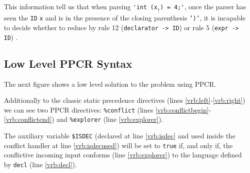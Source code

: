 This information tell us that when parsing 
\verb|'int (x|$_{\uparrow}$\verb|) = 4;'|,
once the parser has seen the \texttt{ID} \verb|x| and is in the presence
of the closing parenthesis \texttt{')'}, it is incapable to decide whether 
to reduce by rule 12 (\verb|declarator -> ID|) or rule 5 (\verb|expr -> ID|) .



\subsection{Low Level PPCR Syntax}
\label{subsection:llpcr}

The next figure shows a low level solution
to the problem using PPCR. 

Additionally to the classic static precedence directives (lines \ref{vrb:left}-\ref{vrb:right}) 
we can see two PPCR directives: \verb|%conflict| (lines \ref{vrb:conflictbegin}-\ref{vrb:conflictend})
and \verb|%explorer| (line \ref{vrb:explorer}). 

The auxiliary variable \verb|$ISDEC| 
(declared at line \ref{vrb:isdec} and used inside the conflict handler at line \ref{vrb:isdecused})
will be set to \verb|true| if, and only if, the conflictive incoming input
conforms (line \ref{vrb:explorer}) to the language defined by \verb|decl| (line \ref{vrb:decl}).

